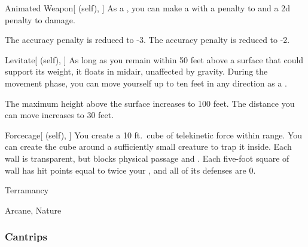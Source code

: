 \lowercase{\hypertarget{spell:Animated Weapon}{}}\label{spell:Animated Weapon}
\begin{attuneability}[Rank 4]{\hypertarget{spell:Animated Weapon}{Animated Weapon}}[ (self), ]
As a , you can make a  with a  penalty to  and a \minus2d penalty to damage.

\rankline
{} The accuracy penalty is reduced to -3.
 The accuracy penalty is reduced to -2.
\end{attuneability}
\vspace{0.25em}



\lowercase{\hypertarget{spell:Levitate}{}}\label{spell:Levitate}
\begin{attuneability}[Rank 4]{\hypertarget{spell:Levitate}{Levitate}}[ (self), ]
As long as you remain within 50 feet above a surface that could support its weight, it floats in midair, unaffected by gravity.
During the movement phase, you can move yourself up to ten feet in any direction as a .

\rankline
{} The maximum height above the surface increases to 100 feet.
 The distance you can move increases to 30 feet.
\end{attuneability}
\vspace{0.25em}



\lowercase{\hypertarget{spell:Forcecage}{}}\label{spell:Forcecage}
\begin{attuneability}[Rank 8]{\hypertarget{spell:Forcecage}{Forcecage}}[ (self), ]
\targetrule
You create a 10 ft.\ cube of telekinetic force within \rngmed range.
You can create the cube around a sufficiently small creature to trap it inside.
Each wall is transparent, but blocks physical passage and .
Each five-foot square of wall has hit points equal to twice your , and all of its defenses are 0.
\end{attuneability}
\vspace{0.25em}


\newpage
\begin{spellsection}{Terramancy}

\begin{spellheader}
\end{spellheader}


 Arcane, Nature

\subsubsection{Cantrips}


\end{spellsection}


